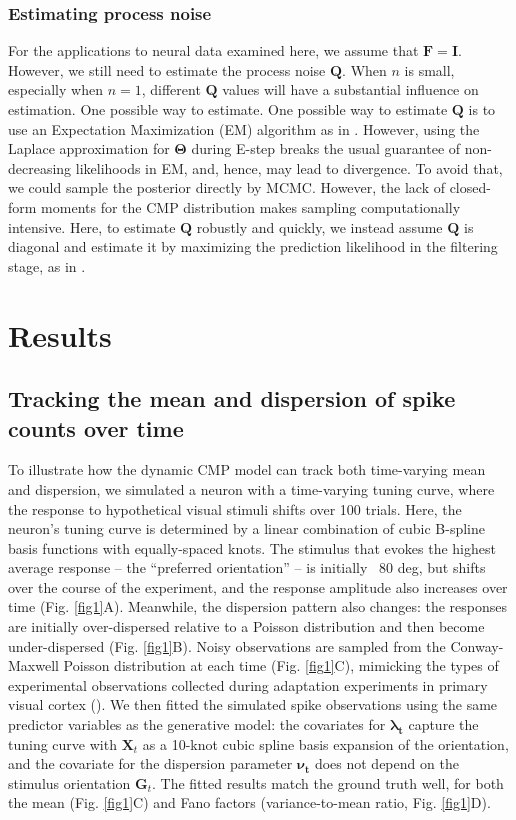 \documentclass[aoas]{imsart}
\theoremstyle{plain}
\theoremstyle{remark}
\begin{document}
\subsubsection{Estimating process noise}
\label{estQ}
For the applications to neural data examined here, we assume that $\bm{F}=\bm{I}$. However, we still need to estimate the process noise $\bm{Q}$. When $n$ is small, especially when $n=1$, different $\bm{Q}$ values will have a substantial influence on estimation. One possible way to estimate. One possible way to estimate $\bm{Q}$ is to use an Expectation Maximization (EM) algorithm as in \cite{Macke2011}. However, using the Laplace approximation for $\bm{\Theta}$ during E-step breaks the usual guarantee of non-decreasing likelihoods in EM, and, hence, may lead to divergence. To avoid that, we could sample the posterior directly by MCMC. However, the lack of closed-form moments for the CMP distribution makes sampling computationally intensive. Here, to estimate $\bm{Q}$ robustly and quickly, we instead assume $\bm{Q}$ is diagonal and estimate it by maximizing the prediction likelihood in the filtering stage, as in \cite{Wei2021}. 

\section{Results}

\subsection{Tracking the mean and dispersion of spike counts over time}
To illustrate how the dynamic CMP model can track both time-varying mean and dispersion, we simulated a neuron with a time-varying tuning curve, where the response to hypothetical visual stimuli shifts over 100 trials. Here, the neuron’s tuning curve is determined by a linear combination of cubic B-spline basis functions with equally-spaced knots. The stimulus that evokes the highest average response – the “preferred orientation” – is initially ~80 deg, but shifts over the course of the experiment, and the response amplitude also increases over time (Fig. \ref{fig1}A). Meanwhile, the dispersion pattern also changes: the responses are initially over-dispersed relative to a Poisson distribution and then become under-dispersed (Fig. \ref{fig1}B). Noisy observations are sampled from the Conway-Maxwell Poisson distribution at each time (Fig. \ref{fig1}C), mimicking the types of experimental observations collected during adaptation experiments in primary visual cortex (\cite{Dragoi2000}). We then fitted the simulated spike observations using the same predictor variables as the generative model: the covariates for $\bm{\lambda_t}$ capture the tuning curve with $\bm{X}_t$ as a 10-knot cubic spline basis expansion of the orientation, and the covariate for the dispersion parameter $\bm{\nu_t}$ does not depend on the stimulus orientation $\bm{G}_t$. The fitted results match the ground truth well, for both the mean (Fig. \ref{fig1}C) and Fano factors (variance-to-mean ratio, Fig. \ref{fig1}D).
\end{document}
